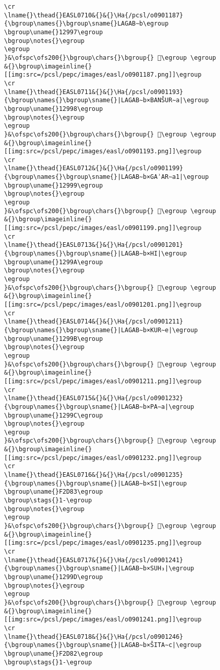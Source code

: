 \begin{verbatim}
\cr
\lname{}\thead{}EASL0710&{}&{}\Ha{/pcsl/o0901187}{\bgroup\names{}\bgroup\sname{}LAGAB∼b\egroup
\bgroup\uname{}12997\egroup
\bgroup\notes{}\egroup
\egroup
}&\ofspc\ofs200{}\bgroup\chars{}\bgroup{} 𒦗\egroup \egroup
&{}\bgroup\imageinline{}[[img:src=/pcsl/pepc/images/easl/o0901187.png]]\egroup
\cr
\lname{}\thead{}EASL0711&{}&{}\Ha{/pcsl/o0901193}{\bgroup\names{}\bgroup\sname{}|LAGAB∼b×BANŠUR∼a|\egroup
\bgroup\uname{}12998\egroup
\bgroup\notes{}\egroup
\egroup
}&\ofspc\ofs200{}\bgroup\chars{}\bgroup{} 𒦘\egroup \egroup
&{}\bgroup\imageinline{}[[img:src=/pcsl/pepc/images/easl/o0901193.png]]\egroup
\cr
\lname{}\thead{}EASL0712&{}&{}\Ha{/pcsl/o0901199}{\bgroup\names{}\bgroup\sname{}|LAGAB∼b×GAʾAR∼a1|\egroup
\bgroup\uname{}12999\egroup
\bgroup\notes{}\egroup
\egroup
}&\ofspc\ofs200{}\bgroup\chars{}\bgroup{} 𒦙\egroup \egroup
&{}\bgroup\imageinline{}[[img:src=/pcsl/pepc/images/easl/o0901199.png]]\egroup
\cr
\lname{}\thead{}EASL0713&{}&{}\Ha{/pcsl/o0901201}{\bgroup\names{}\bgroup\sname{}|LAGAB∼b×HI|\egroup
\bgroup\uname{}1299A\egroup
\bgroup\notes{}\egroup
\egroup
}&\ofspc\ofs200{}\bgroup\chars{}\bgroup{} 𒦚\egroup \egroup
&{}\bgroup\imageinline{}[[img:src=/pcsl/pepc/images/easl/o0901201.png]]\egroup
\cr
\lname{}\thead{}EASL0714&{}&{}\Ha{/pcsl/o0901211}{\bgroup\names{}\bgroup\sname{}|LAGAB∼b×KUR∼e|\egroup
\bgroup\uname{}1299B\egroup
\bgroup\notes{}\egroup
\egroup
}&\ofspc\ofs200{}\bgroup\chars{}\bgroup{} 𒦛\egroup \egroup
&{}\bgroup\imageinline{}[[img:src=/pcsl/pepc/images/easl/o0901211.png]]\egroup
\cr
\lname{}\thead{}EASL0715&{}&{}\Ha{/pcsl/o0901232}{\bgroup\names{}\bgroup\sname{}|LAGAB∼b×PA∼a|\egroup
\bgroup\uname{}1299C\egroup
\bgroup\notes{}\egroup
\egroup
}&\ofspc\ofs200{}\bgroup\chars{}\bgroup{} 𒦜\egroup \egroup
&{}\bgroup\imageinline{}[[img:src=/pcsl/pepc/images/easl/o0901232.png]]\egroup
\cr
\lname{}\thead{}EASL0716&{}&{}\Ha{/pcsl/o0901235}{\bgroup\names{}\bgroup\sname{}|LAGAB∼b×SI|\egroup
\bgroup\uname{}F2D83\egroup
\bgroup\stags{}1-\egroup
\bgroup\notes{}\egroup
\egroup
}&\ofspc\ofs200{}\bgroup\chars{}\bgroup{} 󲶃\egroup \egroup
&{}\bgroup\imageinline{}[[img:src=/pcsl/pepc/images/easl/o0901235.png]]\egroup
\cr
\lname{}\thead{}EASL0717&{}&{}\Ha{/pcsl/o0901241}{\bgroup\names{}\bgroup\sname{}|LAGAB∼b×SUH₃|\egroup
\bgroup\uname{}1299D\egroup
\bgroup\notes{}\egroup
\egroup
}&\ofspc\ofs200{}\bgroup\chars{}\bgroup{} 𒦝\egroup \egroup
&{}\bgroup\imageinline{}[[img:src=/pcsl/pepc/images/easl/o0901241.png]]\egroup
\cr
\lname{}\thead{}EASL0718&{}&{}\Ha{/pcsl/o0901246}{\bgroup\names{}\bgroup\sname{}|LAGAB∼b×ŠITA∼c|\egroup
\bgroup\uname{}F2D82\egroup
\bgroup\stags{}1-\egroup

\end{verbatim}
